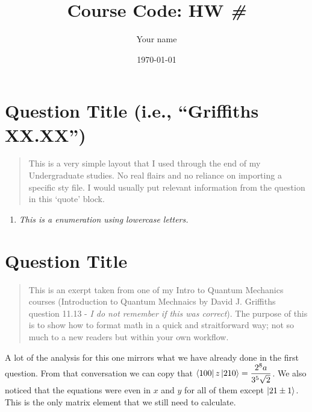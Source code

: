 \documentclass[10pt]{article}
\begin{document}
\title{Course Code: HW \textit{\#}}
\author{Your name}
\date{\today}
\maketitle


\section*{Question Title (i.e., ``Griffiths XX.XX'')}
\begin{quote}
    This is a very simple layout that I used through the end of my Undergraduate studies. No real flairs and no reliance on importing a specific sty file. I would usually put relevant information from the question in this `quote' block.
\end{quote}\vspace*{1em}

\begin{enumerate}[label=\alph*)] 
\item \textit{This is a enumeration using lowercase letters.}
\end{enumerate}

\clearpage          %

\section*{Question Title}

\begin{quote}
    This is an exerpt taken from one of my Intro to Quantum Mechanics courses (Introduction to Quantum Mechnaics by David J. Griffiths question 11.13 - \textit{I do not remember if this was correct}). The purpose of this is to show how to format math in a quick and straitforward way; not so much to a new readers but within your own workflow.
\end{quote}\vspace*{1em}

A lot of the analysis for this one mirrors what we have already done in the first question. From that conversation we can copy that $\displaystyle{\bra{1 0 0 } z \ket{2 1 0} = \frac{2^8 a}{3^5 \sqrt{2}}}$. We also noticed that the equations were even in $x$ and $y$ for all of them except $\ket{2 1 \pm 1}$. This is the only matrix element that we still need to calculate.
\end{document}
